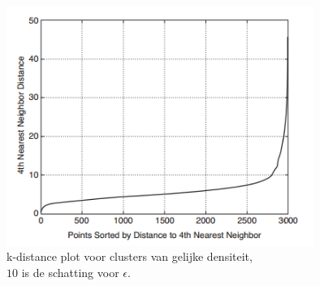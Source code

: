 \documentclass[a4paper,12pt]{article}
\theoremstyle{definition}
\begin{document}
 \begin{figure}[!ht]\centering
  \includegraphics[width=10cm]{dbscan_kdist.png}
  \caption{k-distance plot voor clusters van gelijke densiteit,\\$10$ is de schatting voor $\epsilon$.}
  \label{kdist}
 \end{figure}
\newpage
\end{document}
